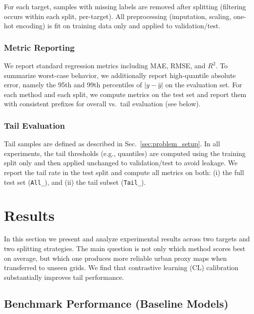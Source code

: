 \documentclass[preprint,12pt]{elsarticle}
\begin{document}
\textbf{} For each target, samples with missing labels are removed after splitting (filtering occurs within each split, per-target). All preprocessing (imputation, scaling, one-hot encoding) is fit on training data only and applied to validation/test.

\subsubsection{Metric Reporting}
\label{sec:metric_reporting}
We report standard regression metrics including MAE, RMSE, and \(R^2\).
To summarize worst-case behavior, we additionally report high-quantile absolute error, namely the 95th and 99th percentiles of \(|y-\hat{y}|\) on the evaluation set.
For each method and each split, we compute metrics on the test set and report them with consistent prefixes for overall vs.\ tail evaluation (see below).

\subsubsection{Tail Evaluation}
\label{sec:tail_evaluation_protocol}
Tail samples are defined as described in Sec.~\ref{sec:problem_setup}. In all experiments, the tail thresholds (e.g., quantiles) are computed using the training split only and then applied unchanged to validation/test to avoid leakage.
We report the tail rate in the test split and compute all metrics on both:
(i) the full test set (\texttt{All\_}), and
(ii) the tail subset (\texttt{Tail\_}).



\section{Results}

In this section we present and analyze experimental results across two targets and two splitting strategies. The main question is not only which method scores best on average, but which one produces more reliable urban proxy maps when transferred to unseen grids. We find that contrastive learning (CL) calibration substantially improves tail performance.

\subsection{Benchmark Performance (Baseline Models)}
\end{document}
